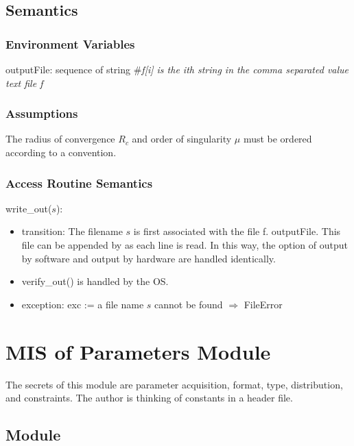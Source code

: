 \documentclass[12pt, titlepage]{article}
\begin{document}
\subsection{Semantics}

\subsubsection{Environment Variables}

outputFile: sequence of string \#\textit{f[i] is the ith string in the comma separated value text file f}\\ 

\subsubsection{Assumptions}

The radius of convergence $R_c$ and order of singularity $\mu$ must be ordered according to a convention.

\subsubsection{Access Routine Semantics}

\noindent write\_out($s$):
\begin{itemize}
\item transition: The filename $s$ is first associated with the file f.  {outputFile}. This file
  can be appended by  as each line is read.
  In this way, the option of output by software and output by hardware are handled identically.
\item verify\_out() is handled by the OS.
\item exception: exc := a file name $s$ cannot be found $\Rightarrow$  FileError
\end{itemize}

\section{MIS of Parameters Module} \label{sc:MIS_PARAM}

The secrets of this module are parameter acquisition, format, type, distribution, and constraints.
The author is thinking of constants in a header file.

\subsection{Module}
\end{document}
